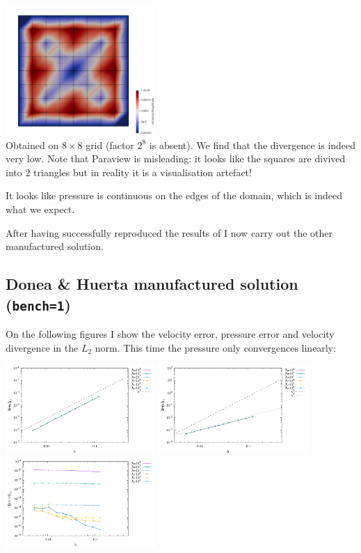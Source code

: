 \begin{center}
\includegraphics[width=5.7cm]{python_codes/fieldstone_161/results/bench2/vel_error}\\
{\captionfont Obtained on $8\times8$ grid (factor $2^8$ is absent). 
We find that the divergence is indeed very low.
Note that Paraview is misleading: it looks like the squares are divived into 2 triangles but
in reality it is a visualisation artefact!}
\end{center}

It looks like pressure is continuous on the edges of the domain, 
which is indeed what we expect.

After having successfully reproduced the results of \textcite{huzh11}
I now carry out the other manufactured solution.

\subsection*{Donea \& Huerta manufactured solution ({\tt bench=1})}

On the following figures I show the velocity error, pressure error and velocity 
divergence in the $L_2$ norm.
This time the pressure only convergences linearly:

\begin{center}
\includegraphics[width=5.7cm]{python_codes/fieldstone_161/results/bench1/errorsV.pdf}
\includegraphics[width=5.7cm]{python_codes/fieldstone_161/results/bench1/errorsP.pdf}
\includegraphics[width=5.7cm]{python_codes/fieldstone_161/results/bench1/errorsDivv.pdf}
\end{center}

